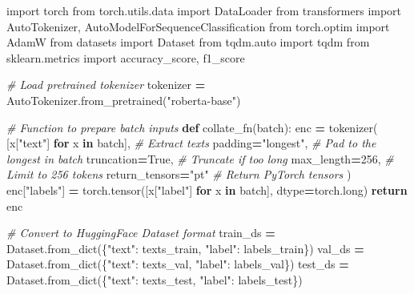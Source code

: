 \documentclass[
]{article}
\newenvironment{Shaded}{\begin{snugshade}}{\end{snugshade}}
\newcommand{\BuiltInTok}[1]{#1}
\newcommand{\CommentTok}[1]{\textcolor[rgb]{0.56,0.35,0.01}{\textit{#1}}}
\newcommand{\ControlFlowTok}[1]{\textcolor[rgb]{0.13,0.29,0.53}{\textbf{#1}}}
\newcommand{\DecValTok}[1]{\textcolor[rgb]{0.00,0.00,0.81}{#1}}
\newcommand{\ImportTok}[1]{#1}
\newcommand{\KeywordTok}[1]{\textcolor[rgb]{0.13,0.29,0.53}{\textbf{#1}}}
\newcommand{\NormalTok}[1]{#1}
\newcommand{\OperatorTok}[1]{\textcolor[rgb]{0.81,0.36,0.00}{\textbf{#1}}}
\newcommand{\StringTok}[1]{\textcolor[rgb]{0.31,0.60,0.02}{#1}}
\newcommand{\VariableTok}[1]{\textcolor[rgb]{0.00,0.00,0.00}{#1}}
\begin{document}
\begin{Shaded}
\begin{Highlighting}[]
\ImportTok{import}\NormalTok{ torch}
\ImportTok{from}\NormalTok{ torch.utils.data }\ImportTok{import}\NormalTok{ DataLoader}
\ImportTok{from}\NormalTok{ transformers }\ImportTok{import}\NormalTok{ AutoTokenizer, AutoModelForSequenceClassification}
\ImportTok{from}\NormalTok{ torch.optim }\ImportTok{import}\NormalTok{ AdamW}
\ImportTok{from}\NormalTok{ datasets }\ImportTok{import}\NormalTok{ Dataset}
\ImportTok{from}\NormalTok{ tqdm.auto }\ImportTok{import}\NormalTok{ tqdm}
\ImportTok{from}\NormalTok{ sklearn.metrics }\ImportTok{import}\NormalTok{ accuracy\_score, f1\_score}

\CommentTok{\# Load pretrained tokenizer}
\NormalTok{tokenizer }\OperatorTok{=}\NormalTok{ AutoTokenizer.from\_pretrained(}\StringTok{"roberta{-}base"}\NormalTok{)}

\CommentTok{\# Function to prepare batch inputs}
\KeywordTok{def}\NormalTok{ collate\_fn(batch):}
\NormalTok{    enc }\OperatorTok{=}\NormalTok{ tokenizer(}
\NormalTok{        [x[}\StringTok{"text"}\NormalTok{] }\ControlFlowTok{for}\NormalTok{ x }\KeywordTok{in}\NormalTok{ batch],  }\CommentTok{\# Extract texts}
\NormalTok{        padding}\OperatorTok{=}\StringTok{"longest"}\NormalTok{,           }\CommentTok{\# Pad to the longest in batch}
\NormalTok{        truncation}\OperatorTok{=}\VariableTok{True}\NormalTok{,             }\CommentTok{\# Truncate if too long}
\NormalTok{        max\_length}\OperatorTok{=}\DecValTok{256}\NormalTok{,              }\CommentTok{\# Limit to 256 tokens}
\NormalTok{        return\_tensors}\OperatorTok{=}\StringTok{"pt"}          \CommentTok{\# Return PyTorch tensors}
\NormalTok{    )}
\NormalTok{    enc[}\StringTok{"labels"}\NormalTok{] }\OperatorTok{=}\NormalTok{ torch.tensor([x[}\StringTok{"label"}\NormalTok{] }\ControlFlowTok{for}\NormalTok{ x }\KeywordTok{in}\NormalTok{ batch], dtype}\OperatorTok{=}\NormalTok{torch.}\BuiltInTok{long}\NormalTok{)}
    \ControlFlowTok{return}\NormalTok{ enc}

\CommentTok{\# Convert to HuggingFace Dataset format}
\NormalTok{train\_ds }\OperatorTok{=}\NormalTok{ Dataset.from\_dict(\{}\StringTok{"text"}\NormalTok{: texts\_train, }\StringTok{"label"}\NormalTok{: labels\_train\})}
\NormalTok{val\_ds   }\OperatorTok{=}\NormalTok{ Dataset.from\_dict(\{}\StringTok{"text"}\NormalTok{: texts\_val,   }\StringTok{"label"}\NormalTok{: labels\_val\})}
\NormalTok{test\_ds  }\OperatorTok{=}\NormalTok{ Dataset.from\_dict(\{}\StringTok{"text"}\NormalTok{: texts\_test,  }\StringTok{"label"}\NormalTok{: labels\_test\})}


\end{Highlighting}
\end{Shaded}
\end{document}
